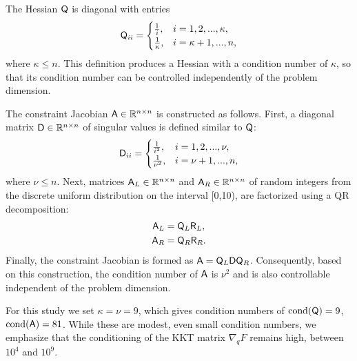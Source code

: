 The Hessian $\mathsf{Q}$ is diagonal with entries
\begin{equation*}
  \mathsf{Q}_{ii} = \begin{cases}
    \frac{1}{i}, &  i = 1, 2, ...,  \kappa, \\
    \frac{1}{\kappa}, & i =  \kappa+1, ... , n, \\
  \end{cases}
\end{equation*}
where $\kappa \leq n$.  This definition produces a Hessian with a condition
number of $\kappa$,  so that its condition number 
can be controlled independently of the problem dimension.

The constraint Jacobian $\mathsf{A} \in \mathbb{R}^{n\times n}$ is constructed as follows. First, a diagonal matrix 
$\mathsf{D} \in \mathbb{R}^{n\times n}$ of singular values is defined similar to $\mathsf{Q}$:
\begin{equation*}
  \mathsf{D}_{ii} = \begin{cases}
    \frac{1}{i^2}, &  i = 1,2,...,\nu, \\
    \frac{1}{\nu^2}, & i = \nu+1, ..., n, \\
  \end{cases}
\end{equation*}
where $\nu \leq n$.  Next, matrices $\mathsf{A}_L  \in \mathbb{R}^{n\times n} $ and $\mathsf{A}_R \in \mathbb{R}^{n\times n}$ of random integers from 
the discrete uniform distribution on the
interval [0,10),  are factorized using a QR decomposition:  
\begin{equation*}
\begin{aligned}
\mathsf{A}_L &= \mathsf{Q}_L \mathsf{R}_L, \\
\mathsf{A}_R &= \mathsf{Q}_R \mathsf{R}_R. \\
\end{aligned}
\end{equation*}
Finally, the constraint Jacobian is formed as $\mathsf{A} =\mathsf{Q}_L  \mathsf{D} \mathsf{Q}_R $.  
Consequently, based on this construction, the condition number of $\mathsf{A}$ is $\nu ^2$ and is also controllable independent of the problem dimension.

For this study we set $\kappa = \nu = 9$, which gives condition numbers of  
$ \text{cond} (\mathsf{Q} )= 9$,  $ \text{cond} (\mathsf{A}) = 81$. 
While these are modest, even small condition numbers, we emphasize that the conditioning of the KKT matrix $\nabla_q F$ remains high, between $10^4$ and $10^9$.


